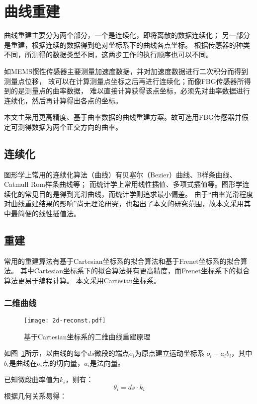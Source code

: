 \cleardoublepage

\section{曲线重建}

曲线重建主要分为两个部分，一个是连续化，即将离散的数据连续化；
另一部分是重建，根据连续的数据得到绝对坐标系下的曲线各点坐标。
根据传感器的种类不同，所测得的数据类型不同，这两步工作的执行顺序也可以不同。

如MEMS惯性传感器主要测量加速度数据，并对加速度数据进行二次积分而得到测量点位移，
故可以在计算测量点坐标之后再进行连续化；而像FBG传感器所得到的是测量点的曲率数据，
难以直接计算获得该点坐标，必须先对曲率数据进行连续化，然后再计算得出各点的坐标。

本文主采用更高精度、基于曲率数据的曲线重建方案。故可选用FBG传感器并假定可测得数据为两个正交方向的曲率。

\subsection{连续化}
图形学上常用的连续化算法（曲线）有贝塞尔（Bezier）曲线、B样条曲线、Catmull Rom样条曲线等；
而统计学上常用线性插值、多项式插值等。图形学连续化的常见目的是得到光滑曲线，而统计学则追求最小偏差。
由于“曲率光滑程度对曲线重建结果的影响”尚无理论研究，也超出了本文的研究范围，故本文采用其中最简便的线性插值法。

\subsection{重建}
常用的重建算法有基于Cartesian坐标系的拟合算法和基于Frenet坐标系的拟合算法。
其中Cartesian坐标系下的拟合算法拥有更高精度，而Frenet坐标系下的拟合算法更易于编程计算。
本文采用Cartesian坐标系。

\subsubsection{二维曲线}

\begin{figure}
\centering
\texttt{[image: 2d-reconst.pdf]}
\caption{基于Cartesian坐标系的二维曲线重建原理}
\label{fig:2d-reconst} 
\end{figure}

如图~\ref{fig:2d-reconst}所示，以曲线的每个$ds$微段的端点$o_i$为原点建立运动坐标系 $o_i-a_ib_i$，其中$b_i$是曲线在$o_i$点的切向量，$a_i$是法向量。

已知微段曲率值为$k_i$，则有：
\begin{equation}
\theta_i = ds\cdot k_i
\end{equation}
根据几何关系易得：

